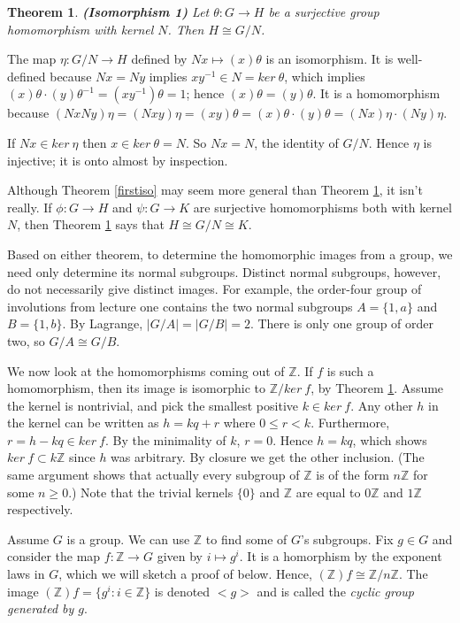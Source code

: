\documentclass[letterpaper]{article}
\newtheorem{theorem}{Theorem}[section]
\newcommand{\mdot}{{\cdot}}
\newenvironment{proof}[1][Proof]{\begin{trivlist}
\item[\hskip \labelsep {\bfseries #1}]}{\end{trivlist}}
\begin{document}
\begin{theorem}
\label{iso1}
\emph{\textbf{(Isomorphism 1)}}
Let $\theta \colon G \rightarrow H$ be a surjective group homomorphism with kernel $N$.  Then $H \cong G/N$.
\end{theorem}
\begin{proof}
The map $\eta \colon G/N \rightarrow H$ defined by $Nx \mapsto (x)\theta$ is an isomorphism. It is well-defined because $Nx = Ny$ implies $xy^{-1} \in N = ker\ \theta$, which implies $(x)\theta\mdot(y)\theta^{-1} = (xy^{-1})\theta = 1$; hence $(x)\theta = (y)\theta$. It is a homomorphism because $(NxNy)\eta = (Nxy)\eta = (xy)\theta = (x)\theta\mdot(y)\theta = (Nx)\eta\mdot(Ny)\eta$.

If $Nx \in ker\ \eta$ then $x \in ker\ \theta = N$. So $Nx = N$, the identity of $G/N$. Hence $\eta$ is injective; it is onto almost by inspection.
\end{proof}

Although Theorem \ref{firstiso} may seem more general than Theorem \ref{iso1}, it isn't really. If $\phi \colon G \rightarrow H$ and $\psi \colon G \rightarrow K$ are surjective homomorphisms both with kernel $N$, then Theorem \ref{iso1} says that $H \cong G/N \cong K$.

Based on either theorem, to determine the homomorphic images from a group, we need only determine its normal subgroups. Distinct normal subgroups, however, do not necessarily give distinct images. For example, the order-four group of involutions from lecture one contains the two normal subgroups $A = \{1, a\}$ and $B = \{1, b\}$. By Lagrange, $|G/A| = |G/B| = 2$. There is only one group of order two, so $G/A \cong G/B$.

We now look at the homomorphisms coming out of $\mathbb{Z}$. If $f$ is such a homomorphism, then its image is isomorphic to $\mathbb{Z}/ker\ f$, by Theorem \ref{iso1}. Assume the kernel is nontrivial, and pick the smallest positive $k \in ker\ f$. Any other $h$ in the kernel can be written as $h = kq + r$ where $0 \le r < k$. Furthermore, $r = h - kq \in ker\ f$. By the minimality of $k$, $r = 0$. Hence $h = kq$, which shows $ker\ f \subset k\mathbb{Z}$ since $h$ was arbitrary. By closure we get the other inclusion. (The same argument shows that actually every subgroup of $\mathbb{Z}$ is of the form $n\mathbb{Z}$ for some $n \ge 0$.) Note that the trivial kernels $\{0\}$ and $\mathbb{Z}$ are equal to $0\mathbb{Z}$ and $1\mathbb{Z}$ respectively.

Assume $G$ is a group. We can use $\mathbb{Z}$ to find some of $G$'s subgroups. Fix $g \in G$ and consider the map $f \colon \mathbb{Z} \rightarrow G$ given by $i \mapsto g^{i}$. It is a homorphism by the exponent laws in $G$, which we will sketch a proof of below. Hence, $(\mathbb{Z})f \cong \mathbb{Z}/n\mathbb{Z}$. The image $(\mathbb{Z})f = \{g^i \colon i \in \mathbb{Z}\}$ is denoted ${<}g{>}$ and is called the \emph{cyclic group generated by $g$}.
\end{document}
